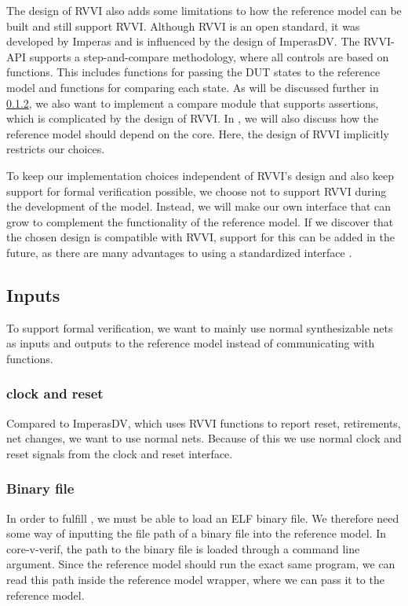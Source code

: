 The design of RVVI also adds some limitations to how the reference model can be built and still support RVVI. Although RVVI is an open standard, it was developed by Imperas and is influenced by the design of ImperasDV. The RVVI-API supports a step-and-compare methodology, where all controls are based on functions. This includes functions for passing the DUT states to the reference model and functions for comparing each state\cite{riscv-verificationRISCVVerificationInterface2023}. As will be discussed further in \ref{}, we also want to implement a compare module that supports assertions, which is complicated by the design of RVVI. 
In , we will also discuss how the reference model should depend on the core. Here, the design of RVVI implicitly restricts our choices. 

To keep our implementation choices independent of RVVI's design and also keep support for formal verification possible, we choose not to support RVVI during the development of the model. Instead, we will make our own interface that can grow to complement the functionality of the reference model. If we discover that the chosen design is compatible with RVVI, support for this can be added in the future, as there are many advantages to using a standardized interface \cite{riscv-verificationRISCVVerificationInterface2023}.


\subsection{Inputs}

To support formal verification, we want to mainly use normal synthesizable nets as inputs and outputs to the reference model instead of communicating with functions.

\subsubsection{clock and reset}

Compared to ImperasDV, which uses RVVI functions to report reset, retirements, net changes, we want to use normal nets. Because of this we use normal clock and reset signals from the  clock and reset interface. 

\subsubsection{Binary file}
In order to fulfill , we must be able to load an ELF binary file. We therefore need some way of inputting the file path of a binary file into the reference model. In core-v-verif, the path to the binary file is loaded through a command line argument. Since the reference model should run the exact same program, we can read this path inside the reference model wrapper, where we can pass it to the reference model.

